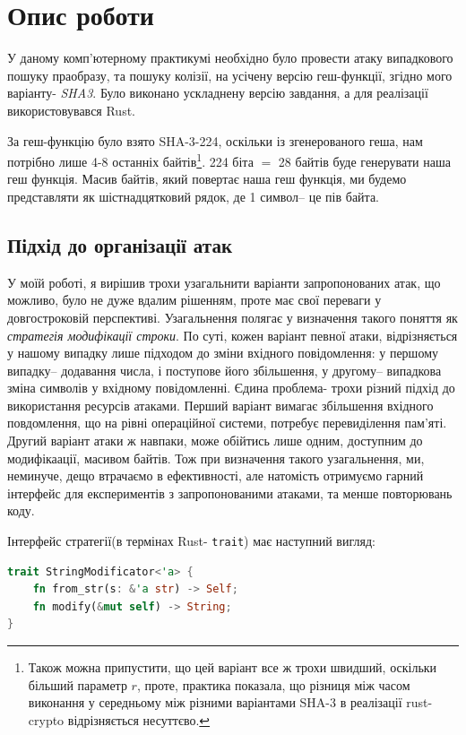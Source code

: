 \documentclass[12pt]{article}
\begin{document}


\section{Опис роботи}

У даному комп'ютерному практикумі необхідно було провести атаку випадкового пошуку праобразу, та пошуку колізії, на усічену версію геш-функції, згідно мого варіанту- \emph{SHA3}. Було виконано ускладнену версію завдання, а для реалізації використовувався Rust.

За геш-функцію було взято SHA-3-224, оскільки із згенерованого геша, нам потрібно лише 4-8 останніх байтів\footnote{Також можна припустити, що цей варіант все ж трохи швидший, оскільки більший параметр $r$, проте, практика показала, що різниця між часом виконання у середньому між різними варіантами SHA-3 в реалізації rust-crypto відрізняється несуттєво.}. 224 біта $=$ 28 байтів буде генерувати наша геш функція. Масив байтів, який повертає наша геш функція, ми будемо представляти як шістнадцятковий рядок, де 1 символ-- це пів байта.

\subsection{Підхід до організації атак}

У моїй роботі, я вирішив трохи узагальнити варіанти запропонованих атак, що можливо, було не дуже вдалим рішенням, проте має свої переваги у довгостроковій перспективі. Узагальнення полягає у визначення такого поняття як \textit{стратегія модифікації строки}. По суті, кожен варіант певної атаки, відрізняється у нашому випадку лише підходом до зміни вхідного повідомлення: у першому випадку-- додавання числа, і поступове його збільшення, у другому-- випадкова зміна символів у вхідному повідомленні. Єдина проблема- трохи різний підхід до використання ресурсів атаками. Перший варіант вимагає збільшення вхідного повдомлення, що на рівні операційної системи, потребує перевиділення пам'яті. Другий варіант атаки ж навпаки, може обійтись лише одним, доступним до модифікаації, масивом байтів. Тож при визначення такого узагальнення, ми, неминуче, дещо втрачаємо в ефективності, але натомість отримуємо гарний інтерфейс для експериментів з запропонованими атаками, та менше повторювань коду.

Інтерфейс стратегії(в термінах Rust- \lstinline{trait}) має наступний вигляд:

\begin{lstlisting}[language=rust]
trait StringModificator<'a> {
    fn from_str(s: &'a str) -> Self;
    fn modify(&mut self) -> String;
}
\end{lstlisting}
\end{document}
